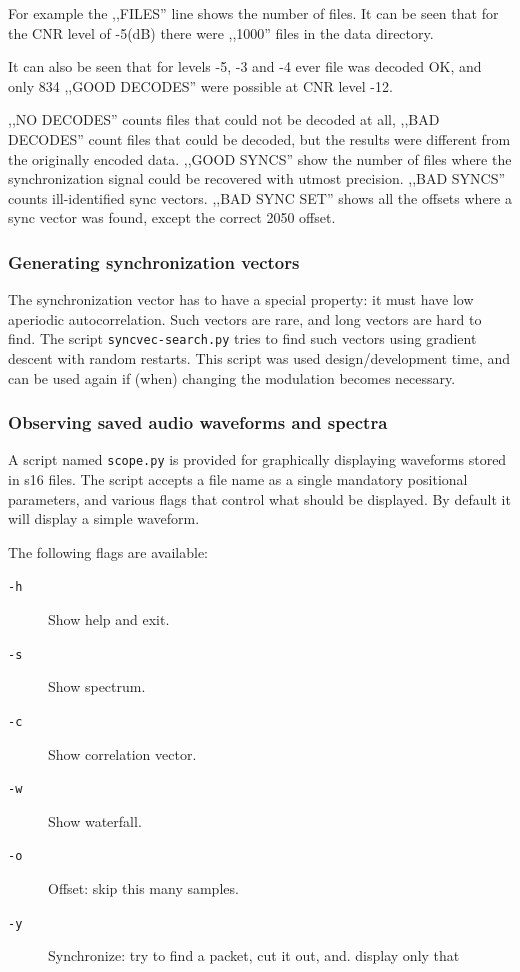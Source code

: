 \documentclass[a4paper]{article}
\begin{document}
For example the ,,FILES'' line shows the number of files. It can be 
seen that for the CNR level of -5(dB) there were ,,1000'' files in the 
data directory.

It can also be seen that for levels -5, -3 and -4 ever file was decoded 
OK, and only 834 ,,GOOD DECODES'' were possible at CNR level -12.

,,NO DECODES'' counts files that could not be decoded at all, ,,BAD 
DECODES'' count files that could be decoded, but the results were 
different from the originally encoded data. ,,GOOD SYNCS'' show the 
number of files where the synchronization signal could be recovered 
with utmost precision. ,,BAD SYNCS'' counts ill-identified sync 
vectors. ,,BAD SYNC SET'' shows all the offsets where a sync vector was 
found, except the correct 2050 offset.

\subsubsection{Generating synchronization vectors}

The synchronization vector has to have a special property: it must have 
low aperiodic autocorrelation. Such vectors are rare, and long vectors 
are hard to find. The script \texttt{syncvec-search.py} tries to find 
such vectors using gradient descent with random restarts. This script 
was used design/development time, and can be used again if (when) 
changing the modulation becomes necessary.

\subsubsection{Observing saved audio waveforms and spectra}

A script named \texttt{scope.py} is provided for graphically displaying 
waveforms stored in s16 files. The script accepts a file name as a 
single mandatory positional parameters, and various flags that control 
what should be displayed. By default it will display a simple waveform.

The following flags are available:

\begin{description}
\item[\texttt{-h}] Show help and exit.
\item[\texttt{-s}] Show spectrum.
\item[\texttt{-c}] Show correlation vector.
\item[\texttt{-w}] Show waterfall.
\item[\texttt{-o}] Offset: skip this many samples.
\item[\texttt{-y}] Synchronize: try to find a packet, cut it out, and.
  display only that
\end{description}
\end{document}
